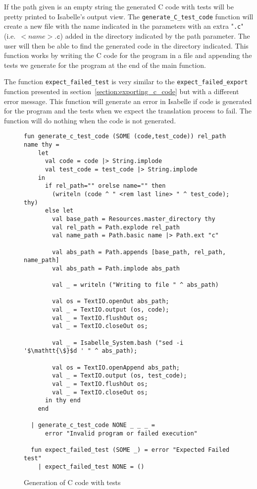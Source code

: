 If the path given is an empty string the generated C code with tests will be pretty printed to Isabelle's output view.
The \verb|generate_C_test_code| function will create a new file with the name indicated in the parameters with an extra "\verb|.c|" (i.e.\ $<name>\mathtt{.c}$) added in the directory indicated by the path parameter.
The user will then be able to find the generated code in the directory indicated.
This function works by writing the C code for the program in a file and appending the tests we generate for the program at the end of the main function.

The function \verb|expect_failed_test| is very similar to the \verb|expect_failed_export| function presented in section~\ref{section:exporting_c_code} but with a different error message.
This function will generate an error in Isabelle if code is generated for the program and the tests when we expect the translation process to fail.
The function will do nothing when the code is not generated.

\begin{figure}
\begin{lstlisting}[mathescape=true]
  fun generate_c_test_code (SOME (code,test_code)) rel_path name thy =
    let
      val code = code |> String.implode
      val test_code = test_code |> String.implode
    in
      if rel_path="" orelse name="" then
        (writeln (code ^ " <rem last line> " ^ test_code); thy)
      else let
        val base_path = Resources.master_directory thy
        val rel_path = Path.explode rel_path
        val name_path = Path.basic name |> Path.ext "c"

        val abs_path = Path.appends [base_path, rel_path, name_path]
        val abs_path = Path.implode abs_path

        val _ = writeln ("Writing to file " ^ abs_path)

        val os = TextIO.openOut abs_path;
        val _ = TextIO.output (os, code);
        val _ = TextIO.flushOut os;
        val _ = TextIO.closeOut os;

        val _ = Isabelle_System.bash ("sed -i '$\mathtt{\$}$d ' " ^ abs_path);

        val os = TextIO.openAppend abs_path;
        val _ = TextIO.output (os, test_code);
        val _ = TextIO.flushOut os;
        val _ = TextIO.closeOut os;
      in thy end
    end

  | generate_c_test_code NONE _ _ _ =
      error "Invalid program or failed execution"

  fun expect_failed_test (SOME _) = error "Expected Failed test"
    | expect_failed_test NONE = ()
\end{lstlisting}

\caption{Generation of C code with tests}
\label{fig:generate_c_test_code}
\end{figure}


